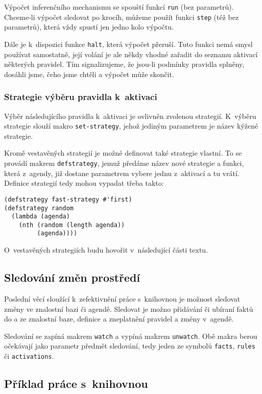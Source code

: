 Výpočet inferenčního mechanismu se spouští funkcí \verb|run| (bez parametrů).
Chceme-li výpočet sledovat po krocíh, můžeme použít funkci \verb|step| (též bez
parametrů), která vždy spustí jen jedno kolo výpočtu.

Dále je k~dispozici funkce \verb|halt|, která výpočet přeruší. Tuto funkci nemá
smysl používat samostatně, její volání je ale někdy vhodné zařadit do seznamu
aktivací některých pravidel. Tím signalizujeme, že jsou-li podmínky pravidla
splněny, dosáhli jsme, čeho jsme chtěli a výpočet může skončit.

\subsubsection{Strategie výběru pravidla k~aktivaci}
Výběr následujícího pravidla k~aktivaci je ovlivněn zvolenou strategií.
K~výběru strategie slouží makro \verb|set-strategy|, jehož jediným parametrem je
název kýžené strategie.

Kromě vestavěných strategií je možné definovat také strategie vlastní. To se
provádí makrem \verb|defstrategy|, jemuž předáme název nové strategie a
funkci, která z~agendy, již dostane parametrem vybere jednu z~aktivací a tu
vrátí. Definice strategií tedy mohou vypadat třeba takto:
\begin{verbatim}
(defstrategy fast-strategy #'first)
(defstrategy random
  (lambda (agenda)
    (nth (random (length agenda))
         (agenda))))
\end{verbatim}
O~vestavěných strategiích budu hovořit v~následující části textu.
\subsection{Sledování změn prostředí}
Poslední věcí sloužící k~zefektivnění práce s~knihovnou je možnost sledovat
změny ve znalostní bazi či agendě. Sledovat je možno přidávání či ubíraní faktů
do a ze znalostní baze, definice a zneplatnění pravidel a změny v~agendě.

Sledování se zapíná makrem \verb|watch| a vypíná makrem \verb|unwatch|. Obě
makra berou očekávají jako parametr předmět sledování, tedy jeden ze symbolů
\verb|facts|, \verb|rules| či \verb|activations|.
\subsection{Příklad práce s~knihovnou}

